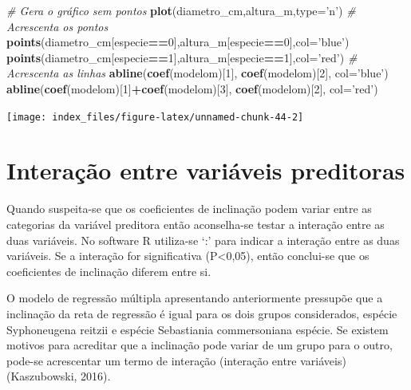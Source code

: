 \documentclass[12pt,brazil,oneside]{book}
\newenvironment{Shaded}{\begin{snugshade}}{\end{snugshade}}
\newcommand{\CommentTok}[1]{\textcolor[rgb]{0.56,0.35,0.01}{\textit{#1}}}
\newcommand{\DataTypeTok}[1]{\textcolor[rgb]{0.13,0.29,0.53}{#1}}
\newcommand{\DecValTok}[1]{\textcolor[rgb]{0.00,0.00,0.81}{#1}}
\newcommand{\KeywordTok}[1]{\textcolor[rgb]{0.13,0.29,0.53}{\textbf{#1}}}
\newcommand{\NormalTok}[1]{#1}
\newcommand{\OperatorTok}[1]{\textcolor[rgb]{0.81,0.36,0.00}{\textbf{#1}}}
\newcommand{\StringTok}[1]{\textcolor[rgb]{0.31,0.60,0.02}{#1}}
\begin{document}
\begin{Shaded}
\begin{Highlighting}[]
\CommentTok{# Gera o gráfico sem pontos}
\KeywordTok{plot}\NormalTok{(diametro_cm,altura_m,}\DataTypeTok{type=}\StringTok{'n'}\NormalTok{) }
\CommentTok{# Acrescenta os pontos}
\KeywordTok{points}\NormalTok{(diametro_cm[especie}\OperatorTok{==}\DecValTok{0}\NormalTok{],altura_m[especie}\OperatorTok{==}\DecValTok{0}\NormalTok{],}\DataTypeTok{col=}\StringTok{'blue'}\NormalTok{)}
\KeywordTok{points}\NormalTok{(diametro_cm[especie}\OperatorTok{==}\DecValTok{1}\NormalTok{],altura_m[especie}\OperatorTok{==}\DecValTok{1}\NormalTok{],}\DataTypeTok{col=}\StringTok{'red'}\NormalTok{)}
\CommentTok{# Acrescenta as linhas}
\KeywordTok{abline}\NormalTok{(}\KeywordTok{coef}\NormalTok{(modelom)[}\DecValTok{1}\NormalTok{], }\KeywordTok{coef}\NormalTok{(modelom)[}\DecValTok{2}\NormalTok{], }\DataTypeTok{col=}\StringTok{'blue'}\NormalTok{)}
\KeywordTok{abline}\NormalTok{(}\KeywordTok{coef}\NormalTok{(modelom)[}\DecValTok{1}\NormalTok{]}\OperatorTok{+}\KeywordTok{coef}\NormalTok{(modelom)[}\DecValTok{3}\NormalTok{], }\KeywordTok{coef}\NormalTok{(modelom)[}\DecValTok{2}\NormalTok{], }\DataTypeTok{col=}\StringTok{'red'}\NormalTok{)}
\end{Highlighting}
\end{Shaded}

\begin{center}\texttt{[image: index\_files/figure-latex/unnamed-chunk-44-2]} \end{center}

\hypertarget{interacao-entre-variaveis-preditoras}{%
\section{Interação entre variáveis preditoras}\label{interacao-entre-variaveis-preditoras}}

Quando suspeita-se que os coeficientes de inclinação podem variar entre as categorias da variável preditora então aconselha-se testar a interação entre as duas variáveis. No software R utiliza-se `:' para indicar a interação entre as duas variáveis. Se a interação for significativa (P\textless{}0,05), então conclui-se que os coeficientes de inclinação diferem entre si.

O modelo de regressão múltipla apresentando anteriormente pressupõe que a inclinação da reta de regressão é igual para os dois grupos considerados, espécie Syphoneugena reitzii e espécie Sebastiania commersoniana espécie. Se existem motivos para acreditar que a inclinação pode variar de um grupo para o outro, pode-se acrescentar um termo de interação (interação entre variáveis) (Kaszubowski, 2016).
\end{document}
